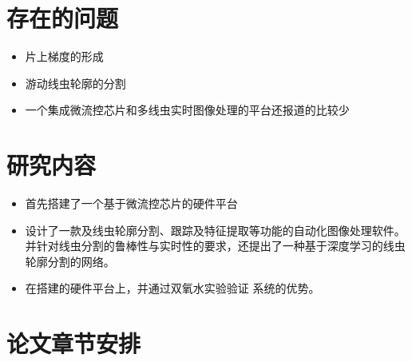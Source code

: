 \section{存在的问题}
\label{sec:intro:analog}
	\begin{itemize}
	  \item 片上梯度的形成
	  \item 游动线虫轮廓的分割
	  \item 一个集成微流控芯片和多线虫实时图像处理的平台还报道的比较少
	\end{itemize}
\section{研究内容}
\label{sec:intro:org}
	\begin{itemize}
	  \item 首先搭建了一个基于微流控芯片的硬件平台
	  \item 设计了一款及线虫轮廓分割、跟踪及特征提取等功能的自动化图像处理软件。
	  并针对线虫分割的鲁棒性与实时性的要求，还提出了一种基于深度学习的线虫轮廓分割的网络。
	  \item 在搭建的硬件平台上，并通过双氧水实验验证 系统的优势。
	\end{itemize}
\section{论文章节安排}
\label{sec:intro:org}
